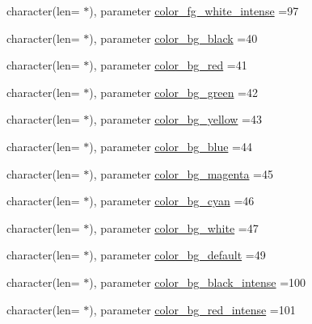 \begin{DoxyCompactItemize}
\item 
character(len= $\ast$), parameter \mbox{\hyperlink{namespacem__escape_ac0eb5968bfff3dfa064ec28b5218b2bf}{color\+\_\+fg\+\_\+white\+\_\+intense}} =\textquotesingle{}97\textquotesingle{}
\item 
character(len= $\ast$), parameter \mbox{\hyperlink{namespacem__escape_a5e4fc9941494a5c9518c84b434bfc97b}{color\+\_\+bg\+\_\+black}} =\textquotesingle{}40\textquotesingle{}
\item 
character(len= $\ast$), parameter \mbox{\hyperlink{namespacem__escape_ad219a6232dbaeb100a6e6cdc0365ee22}{color\+\_\+bg\+\_\+red}} =\textquotesingle{}41\textquotesingle{}
\item 
character(len= $\ast$), parameter \mbox{\hyperlink{namespacem__escape_a7c50b2b50909acf5935f9de7642d30f3}{color\+\_\+bg\+\_\+green}} =\textquotesingle{}42\textquotesingle{}
\item 
character(len= $\ast$), parameter \mbox{\hyperlink{namespacem__escape_a7bd0a1c173252170ccf6976b961fa1c3}{color\+\_\+bg\+\_\+yellow}} =\textquotesingle{}43\textquotesingle{}
\item 
character(len= $\ast$), parameter \mbox{\hyperlink{namespacem__escape_a699e7848c3c43f328168d59211d054cc}{color\+\_\+bg\+\_\+blue}} =\textquotesingle{}44\textquotesingle{}
\item 
character(len= $\ast$), parameter \mbox{\hyperlink{namespacem__escape_a73300e9f70a7abb1ec2a2bdb55194ae5}{color\+\_\+bg\+\_\+magenta}} =\textquotesingle{}45\textquotesingle{}
\item 
character(len= $\ast$), parameter \mbox{\hyperlink{namespacem__escape_a895ed90037352c2ce2be6353f6764cb8}{color\+\_\+bg\+\_\+cyan}} =\textquotesingle{}46\textquotesingle{}
\item 
character(len= $\ast$), parameter \mbox{\hyperlink{namespacem__escape_a26cfeb6eefc9cd1a2c9f419db077ecb1}{color\+\_\+bg\+\_\+white}} =\textquotesingle{}47\textquotesingle{}
\item 
character(len= $\ast$), parameter \mbox{\hyperlink{namespacem__escape_af84f93410fbe9fa8fea3b02ac9371833}{color\+\_\+bg\+\_\+default}} =\textquotesingle{}49\textquotesingle{}
\item 
character(len= $\ast$), parameter \mbox{\hyperlink{namespacem__escape_a80a991f9ee93243b6b9bea07f2ec6d03}{color\+\_\+bg\+\_\+black\+\_\+intense}} =\textquotesingle{}100\textquotesingle{}
\item 
character(len= $\ast$), parameter \mbox{\hyperlink{namespacem__escape_aff3cc89066b789384257efec08bf5123}{color\+\_\+bg\+\_\+red\+\_\+intense}} =\textquotesingle{}101\textquotesingle{}

\end{DoxyCompactItemize}
